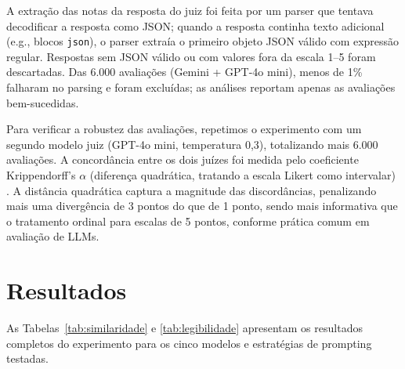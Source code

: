 \documentclass[a4paper, twocolumn, 11pt, twoside]{article}
\begin{document}
A extração das notas da resposta do juiz foi feita por um parser que
tentava decodificar a resposta como JSON; quando a resposta continha
texto adicional (e.g., blocos \texttt{json}), o parser extraía o
primeiro objeto JSON válido com expressão regular. Respostas sem JSON
válido ou com valores fora da escala 1--5 foram descartadas. Das
6.000 avaliações (Gemini + GPT-4o mini), menos de 1\%
falharam no parsing e foram excluídas; as
análises reportam apenas as avaliações bem-sucedidas.

Para verificar a robustez das avaliações, repetimos o experimento com
um segundo modelo juiz (GPT-4o mini, temperatura 0,3), totalizando
mais 6.000 avaliações. A concordância entre os dois juízes foi medida
pelo coeficiente Krippendorff's $\alpha$ (diferença quadrática,
tratando a escala Likert como intervalar) \citep{krippendorff2011}.
A distância quadrática captura a magnitude das discordâncias,
penalizando mais uma divergência de 3 pontos do que de 1 ponto,
sendo mais informativa que o tratamento ordinal para escalas de
5 pontos, conforme prática comum em avaliação de LLMs.

\section{Resultados}

As Tabelas~\ref{tab:similaridade} e \ref{tab:legibilidade} apresentam
os resultados completos do experimento para os cinco modelos e
estratégias de prompting testadas.
\end{document}
